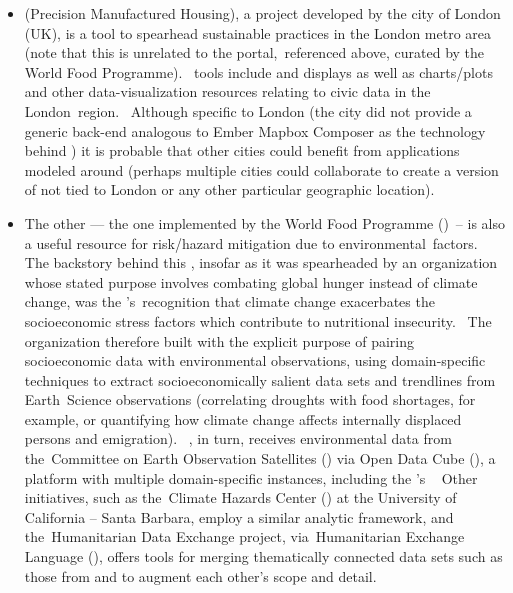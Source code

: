 \documentclass[10.5pt]{article}
\begin{document}
{{\begin{itemize}
\item{} \PRiSM{} (Precision Manufactured Housing), a project developed by the city of London (UK), is a tool to spearhead sustainable \AEC{} practices in the London metro area (note that this \PRiSM{} is unrelated to the \PRISM{} portal, referenced above, curated by the World Food Programme).  \PRiSM{} tools include \GIS{} and \CAD{} displays as well as charts/plots and other data-visualization resources relating to civic \AEC{} data in the London region.  Although specific to London (the city did not provide a generic back-end analogous to Ember Mapbox Composer as the technology behind \ZoLa{}) it is probable that other cities could benefit from applications modeled around \PRiSM{} (perhaps multiple cities could collaborate to create a version of \PRiSM{} not tied to London 
or any other particular geographic location).


\item{} The other \PRISM{} --- the one implemented by the World Food Programme (\WFP{}) -- is also a useful resource for risk/hazard mitigation due to environmental factors.  The backstory behind this \PRISM{}, insofar as it was spearheaded by an organization whose stated purpose involves combating global hunger instead of climate change, was the \WFP{}'s recognition that climate change exacerbates the socioeconomic stress factors which contribute to nutritional insecurity.  The organization therefore built \PRISM{} with the explicit purpose of pairing socioeconomic data with environmental observations, using domain-specific techniques to extract socioeconomically salient data sets and trendlines from Earth Science observations (correlating droughts with food shortages, for example, or quantifying how climate change affects internally displaced persons and emigration).  \PRISM{}, in turn, receives environmental data from the Committee on Earth Observation Satellites (\CEOS{}) via Open Data Cube (\ODC{}), a platform with multiple domain-specific instances, including the \WFP{}'s   Other initiatives, such as the Climate Hazards Center (\CHC{}) at the University of California -- Santa Barbara, employ a similar analytic framework, and the Humanitarian Data Exchange project, via Humanitarian Exchange Language (\HXL{}), offers tools for merging thematically connected data sets such as those from \WFP{} and \CHC{} to augment each other's scope and detail. 


\end{itemize}}}
\end{document}
